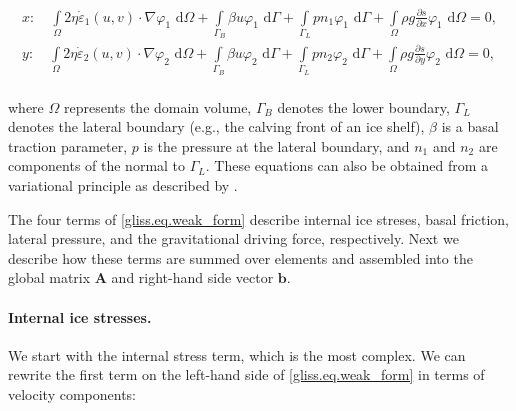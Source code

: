 \begin{equation}
  \label{gliss.eq.weak_form}
  \begin{split}
    x: \quad \int\limits_{\Omega } {2\eta {{{\dot{\varepsilon }}}_{1}}(u,v)\cdot \nabla {{\varphi }_{1}} \text{ d}\Omega }
      + \int\limits_{{\Gamma }_{B}} {\beta u{{\varphi }_{1}} \text{ d}\Gamma} 
      + \int\limits_{{\Gamma }_{L}} {p n_1 {{\varphi }_{1}} \text{ d}\Gamma}
      + \int\limits_{\Omega } {\rho g\frac{\partial s}{\partial x}{{\varphi }_{1}} \text{ d}\Omega}
      = \text{0},  \\
    y: \quad \int\limits_{\Omega } {2\eta {{{\dot{\varepsilon }}}_{2}}(u,v)\cdot \nabla {{\varphi }_{2}} \text{ d}\Omega }
      + \int\limits_{{\Gamma }_{B}} {\beta u{{\varphi }_{2}} \text{ d}\Gamma} 
      + \int\limits_{{\Gamma }_{L}} {p n_2 {{\varphi }_{2}} \text{ d}\Gamma}
      + \int\limits_{\Omega } {\rho g\frac{\partial s}{\partial y}{{\varphi }_{2}} \text{ d}\Omega}
      = \text{0},  \\
  \end{split}
\end{equation}

\noindent
where $\Omega$ represents the domain volume, $\Gamma_{B}$ denotes the lower boundary, $\Gamma_{L}$ denotes the lateral
boundary (e.g., the calving front of an ice shelf), $\beta$ is a basal traction parameter, $p$ is the pressure at the 
lateral boundary, and $n_1$ and $n_2$ are components of the normal to $\Gamma_L$.
These equations can also be obtained from a variational principle as described by \citet{DUKOWICZ:2010wb}.

The four terms of \eqref{gliss.eq.weak_form} describe internal ice streses, basal friction, lateral pressure,
and the gravitational driving force, respectively.  Next we describe how these terms are summed over elements
and assembled into the global matrix $\mathbf{A}$ and right-hand side vector $\mathbf{b}$.

\paragraph{Internal ice stresses.}

We start with the internal stress term, which is the most complex.
We can rewrite the first term on the left-hand side of \eqref{gliss.eq.weak_form} in terms of velocity components:

